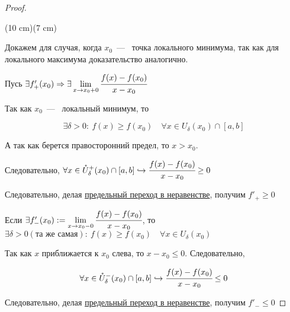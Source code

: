 \begin{proof}
	$\ $
	
	\sidefig(10 cm)(7 cm)	
	{\begin{flushleft}
		\normalsize
		Докажем для случая, когда $x_{0}$~---~ точка локального минимума, так как для локального максимума доказательство аналогично.	
		
		Пусь $ \exists f'_{+}(x_{0}) \Rightarrow \exists \lim\limits_{x\to x_{0}+0} \cfrac{f(x)-f(x_{0})}{x - x_{0}}$
		
		Так как $x_{0}$~---~ локальный минимум, то
		
		$$\exists \delta > 0: \ f(x)\geq f(x_{0}) \quad \forall x\in U_{\delta}(x_{0}) \cap [a,b]$$
		
		А так как берется правосторонний предел, то $x>x_{0}$. 
			
	\end{flushleft}
	}
	{
	}

    Следовательно, $\forall x \in \mathring{U}^{+}_{\delta} (x_{0}) \cap [a, b] \hookrightarrow \cfrac{f(x)-f(x_{0})}{x-x_{0}} \geq 0 $
 
	Следовательно, делая \hyperlink{thm4.8}{предельный переход в неравенстве}, получим $f'_{+} \geq 0$
	
	Если $\exists f'_{-}(x_{0}) := \lim\limits_{x\to x_{0}-0} \cfrac{f(x)-f(x_{0})}{x-x_{0}}$, то
	$ \exists \delta > 0 (\text{та же самая}): \ f(x) \geq f(x_{0}) \quad \forall x\in U_{\delta}(x_{0})
	$
	
	Так как $x$ приближается к $x_{0}$ слева, то $x-x_{0} \leq 0$. Следовательно,
	
	$$\forall x \in \mathring{U}^{-}_{\delta} (x_{0}) \cap [a, b] \hookrightarrow \cfrac{f(x)-f(x_{0})}{x-x_{0}} \leq 0
	$$
	
	Следовательно, делая \hyperlink{thm4.8}{предельный переход в неравенстве}, получим $f'_{-} \leq 0$
\end{proof}

